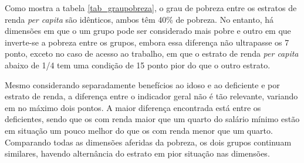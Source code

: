 \documentclass[
	12pt,				%
	openright,			%
	twoside,			%
	a4paper,			%
	english,			%
	french,				%
	spanish,			%
	brazil				%
	]{abntex2}
\begin{document}
Como mostra a tabela \ref{tab_graupobreza}, o grau de pobreza entre os estratos de renda \textit{per capita} são idênticos, ambos têm 40\% de pobreza. No entanto, há dimensões em que o um grupo pode ser considerado mais pobre e outro em que inverte-se a pobreza entre os grupos, embora essa diferença não ultrapasse os 7 ponto, exceto no caso de acesso ao trabalho, em que o estrato de renda \textit{per capita} abaixo de 1/4 tem uma condição de 15 ponto pior do que o outro estrato. 
 
 Mesmo considerando separadamente benefícios ao idoso e ao deficiente e por estrato de renda, a diferença entre o indicador geral não é tão relevante, variando em no máximo dois pontos. A maior diferença encontrada está entre os deficientes, sendo que os com renda maior que um quarto do salário mínimo estão em situação um pouco melhor do que os com renda menor que um quarto. Comparando todas as dimensões aferidas da pobreza, os dois grupos continuam similares, havendo alternância do estrato em pior situação nas dimensões. 
\end{document}
